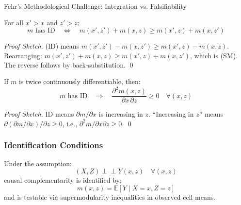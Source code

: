 \begin{chapter}{Fehr's Methodological Challenge: Integration vs. Falsifiability}
\begin{proposition}
\label{prop:id-supermodular}
For all $x' > x$ and $z' > z$:
\begin{equation}
m \text{ has ID} \quad \Longleftrightarrow \quad m(x',z') + m(x,z) \geq m(x',z) + m(x,z')
\tag{SM}
\end{equation}
\end{proposition}

\begin{proof}[Proof Sketch]
(ID) means $m(x',z') - m(x,z') \geq m(x',z) - m(x,z)$.
Rearranging: $m(x',z') + m(x,z) \geq m(x',z) + m(x,z')$, which is (SM).
The reverse follows by back-substitution. \qed
\end{proof}

\begin{proposition}
\label{prop:id-crossderiv}
If $m$ is twice continuously differentiable, then:
\begin{equation}
m \text{ has ID} \quad \Longrightarrow \quad \frac{\partial^2 m(x,z)}{\partial x\,\partial z} \geq 0 \quad \forall(x,z)
\tag{CA}
\end{equation}
\end{proposition}

\begin{proof}[Proof Sketch]
ID means $\partial m/\partial x$ is increasing in $z$.
``Increasing in $z$'' means $\partial(\partial m/\partial x)/\partial z \geq 0$, i.e., $\partial^2 m/\partial x\partial z \geq 0$. \qed
\end{proof}

\subsubsection{Identification Conditions}

\begin{lemma}
\label{lem:joint-ignorability}
Under the assumption:
\begin{equation}
(X,Z) \perp\!\!\!\perp Y(x,z) \quad \forall(x,z)
\tag{A0}
\end{equation}
causal complementarity is identified by:
\begin{equation}
m(x,z) = \mathbb{E}[Y \mid X=x, Z=z]
\end{equation}
and is testable via supermodularity inequalities in observed cell means.
\end{lemma}


\end{chapter}
